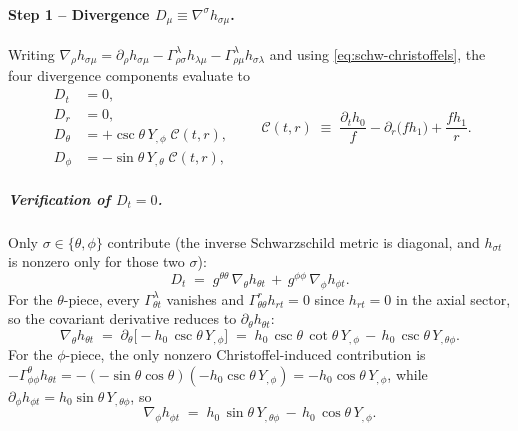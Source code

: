 \paragraph{Step 1 -- Divergence
$D_{\mu}\equiv\nabla^{\sigma}h_{\sigma\mu}$.}
Writing
$\nabla_{\rho}h_{\sigma\mu}
  = \partial_{\rho}h_{\sigma\mu}
  - \Gamma^{\lambda}_{\rho\sigma}h_{\lambda\mu}
  - \Gamma^{\lambda}_{\rho\mu}h_{\sigma\lambda}$
and using \eqref{eq:schw-christoffels}, the four divergence
components evaluate to
\begin{equation}
\begin{aligned}
  D_{t}      &= 0,\\
  D_{r}      &= 0,\\
  D_{\theta} &= +\csc\theta\,Y_{,\phi}\;
                 \mathcal{C}(t,r),\\
  D_{\phi}   &= -\sin\theta\,Y_{,\theta}\;
                 \mathcal{C}(t,r),
\end{aligned}
\qquad
  \mathcal{C}(t,r) \;\equiv\;
  \frac{\partial_{t} h_{0}}{f}
  - \partial_{r}\!\bigl(f h_{1}\bigr)
  + \frac{f h_{1}}{r}.
\label{eq:divergence-axial}
\end{equation}
\subparagraph{Verification of $D_{t}=0$.}
Only $\sigma\in\{\theta,\phi\}$ contribute (the inverse Schwarzschild
metric is diagonal, and $h_{\sigma t}$ is nonzero only for those
two $\sigma$):
\begin{equation}
  D_{t}
  \;=\; g^{\theta\theta}\,\nabla_{\theta}h_{\theta t}
   \,+\, g^{\phi\phi}\,\nabla_{\phi}h_{\phi t}.
  \label{eq:Dt-decomp}
\end{equation}
For the $\theta$-piece, every $\Gamma^{\lambda}_{\theta t}$
vanishes and $\Gamma^{r}_{\theta\theta}h_{rt}=0$ since $h_{rt}=0$
in the axial sector, so the covariant derivative reduces to
$\partial_{\theta}h_{\theta t}$:
\begin{equation}
  \nabla_{\theta}h_{\theta t}
  \;=\; \partial_{\theta}\!\bigl[-h_{0}\,\csc\theta\,Y_{,\phi}\bigr]
  \;=\; h_{0}\,\csc\theta\,\cot\theta\,Y_{,\phi}
       \,-\, h_{0}\,\csc\theta\,Y_{,\theta\phi}.
  \label{eq:nabla-theta-htheta-t}
\end{equation}
For the $\phi$-piece, the only nonzero Christoffel-induced
contribution is $-\Gamma^{\theta}_{\phi\phi}h_{\theta t}
= -(-\sin\theta\cos\theta)(-h_{0}\csc\theta\,Y_{,\phi})
= -h_{0}\cos\theta\,Y_{,\phi}$, while
$\partial_{\phi}h_{\phi t}=h_{0}\sin\theta\,Y_{,\theta\phi}$, so
\begin{equation}
  \nabla_{\phi}h_{\phi t}
  \;=\; h_{0}\,\sin\theta\,Y_{,\theta\phi}
       \,-\, h_{0}\,\cos\theta\,Y_{,\phi}.
  \label{eq:nabla-phi-hphi-t}
\end{equation}
